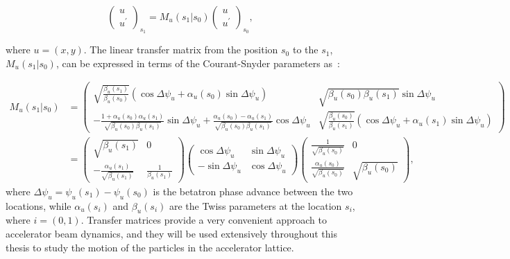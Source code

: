 \begin{equation}\label{eq:matrix_formalism_intro}
   \begin{pmatrix}
    u\\ 
    u^\prime
    \end{pmatrix}_{s_1} = M_u (s_1 |  s_0) \begin{pmatrix}
    u\\ 
    u^\prime
    \end{pmatrix}_{s_0},
\end{equation}

where $u=(x,y)$. The linear transfer matrix from the position $s_0$ to the $s_1$, $M_u (s_1 | s_0)$, can be expressed in terms of the Courant-Snyder parameters as~\cite{Lee:1425444}: %

\begin{equation}\label{eq:linear_transfer_matrix}
    \begin{split}
    M_u (s_1 |  s_0) &= \begin{pmatrix}
        \sqrt{\frac{\beta_u(s_1)}{\beta_u(s_0)}} (\cos{\Delta \psi_u}+\alpha_u (s_0) \sin{\Delta \psi_u}) & \sqrt{\beta_u(s_0)\beta_u(s_1)}\sin{\Delta \psi_u} \\ 
         - \frac{1+\alpha_u(s_0) \alpha_u(s_1)}{\sqrt{\beta_u(s_0) \beta_u(s_1)}} \sin{\Delta \psi_u}+ \frac{\alpha_u(s_0) - \alpha_u(s_1)}{\sqrt{\beta_u(s_0) \beta_u(s_1)}} \cos{\Delta \psi_u} & \sqrt{\frac{\beta_u(s_0)}{\beta_u(s_1)}} (\cos{\Delta \psi_u}+\alpha_u(s_1) \sin{\Delta \psi_u})
        \end{pmatrix} \\ 
        &=\begin{pmatrix}
            \sqrt{\beta_u(s_1)} & 0 \\
            -\frac{\alpha_u(s_1)}{\sqrt{\beta_u(s_1)}}& \frac{1}{\beta_u(s_1)}
            \end{pmatrix} \begin{pmatrix}
            \cos{\Delta \psi_u} & \sin{\Delta \psi_u} \\
            -\sin{\Delta \psi_u}& \cos{\Delta \psi_u}
            \end{pmatrix} \begin{pmatrix}
            \frac{1}{\sqrt{\beta_u(s_0)}} & 0 \\
            \frac{\alpha_u(s_0)}{\sqrt{\beta_u(s_0)}} & \sqrt{\beta_u(s_0)}
            \end{pmatrix},
    \end{split}
\end{equation}
where $\Delta \psi_u = \psi_u(s_1)-\psi_u(s_0)$ is the betatron phase advance between the two locations, while $\alpha_u(s_i)$ and $\beta_u(s_i)$ are the Twiss parameters at the location $s_i$, where $i=(0,1)$. Transfer matrices provide a very convenient approach to accelerator beam dynamics, and they will be used extensively throughout this thesis to study the motion of the particles in the accelerator lattice.

